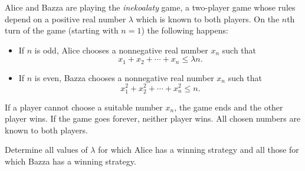 \begin{problem}
Alice and Bazza are playing the \textit{inekoalaty} game, a two-player game whose rules depend on a positive real number $\lambda$ which is known to both players. On the $n$th turn of the game (starting with $n = 1$) the following happens:
\begin{itemize}
    \item If $n$ is odd, Alice chooses a nonnegative real number $x_n$ such that
    \[
    x_1 + x_2 + \cdots + x_n \le \lambda n.
    \]
    \item If $n$ is even, Bazza chooses a nonnegative real number $x_n$ such that 
    \[
    x_1^2 + x_2^2 + \cdots + x_n^2 \le n.
    \]
\end{itemize}

If a player cannot choose a suitable number $x_n$, the game ends and the other player wins. If the game goes forever, neither player wins. All chosen numbers are known to both players.

Determine all values of $\lambda$ for which Alice has a winning strategy and all those for which Bazza has a winning strategy.
\end{problem}

